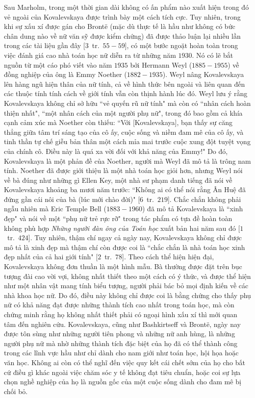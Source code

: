 \begin{multicols}{2}
	Sau Marholm, trong một thời gian dài không có ấn phẩm nào xuất hiện trong đó vẻ ngoài của Kovalevskaya được trình bày một cách tích cực. Tuy nhiên, trong khi sự xấu xí được gán cho Brontë (mặc dù thực tế là hầu như không có bức chân dung nào về nữ văn sỹ được kiểm chứng) đã được thảo luận lại nhiều lần trong các tài liệu gần đây [$3$~tr.~$55-59$],  có một bước ngoặt hoàn toàn trong việc đánh giá cao nhà toán học nữ diễn ra từ những năm $1930$. Nó có lẽ bắt nguồn từ một cáo phó viết vào năm $1935$ bởi Hermann Weyl ($1885-1955$) về đồng nghiệp của ông là Emmy Noether ($1882-1935$). Weyl nâng Kovalevskaya lên hàng ngũ hiện thân của nữ tính, cả về hình thức bên ngoài và liên quan đến các thuộc tính tính cách về giới tính vẫn còn thịnh hành lúc đó. Weyl lưu ý rằng Kovalevskaya không chỉ sở hữu ``vẻ quyến rũ nữ tính" mà còn có ``nhân cách hoàn thiện nhất", ``một nhân cách của một người phụ nữ", trong đó bao gồm cả khía cạnh  cảm xúc mà Noether còn thiếu: ``Với [Kovalevskaya], bạn thấy sự căng thẳng giữa tâm trí sáng tạo của cô ấy, cuộc sống và niềm đam mê của cô ấy, và tinh thần tự chế giễu bản thân một cách mỉa mai trước cuộc xung đột tuyệt vọng của chính cô. Điều này là quá xa vời đối với khả năng của Emmy!" Do đó, Kovalevskaya là một phản đề của Noether, người mà Weyl đã mô tả là trông nam tính. Noether đã được giới thiệu là một nhà toán học giỏi hơn, nhưng Weyl nói về bà đúng như những gì Ellen Key, một nhà sư phạm danh tiếng đã nói về Kovalevskaya khoảng ba mươi năm trước: ``Không ai có thể nói rằng Ân Huệ đã đứng gần cái nôi của bà (lúc mới chào đời)" [$6$~tr.~$219$]. Chắc chắn không phải ngẫu nhiên mà Eric Temple Bell ($1883-1960$) đã mô tả Kovalevskaya là ``xinh đẹp" và nói về một ``phụ nữ trẻ rực rỡ" trong tác phẩm có tựa đề hoàn toàn không phù hợp \textit{Những người đàn ông của Toán học} xuất bản hai năm sau đó [$1$~tr.~$424$]. Tuy nhiên, thậm chí ngay cả ngày nay, Kovalevskaya không chỉ được mô tả là xinh đẹp mà thậm chí còn được coi là ``chắc chắn là nhà toán học xinh đẹp nhất của cả hai giới tính" [$2$~tr.~$78$].
	\vskip 0.1cm
	Theo cách thể hiện hiện đại, Kovalevskaya không đơn thuần là một hình mẫu. Bà thường được đặt trên bục tượng đài cao vời vợi, không nhất thiết theo một cách có ý thức, và được thể hiện như một nhân vật mang tính biểu tượng, người phải bác bỏ mọi định kiến về các nhà khoa học nữ. Do đó, điều này không chỉ được coi là bằng chứng cho thấy phụ nữ có khả năng đạt được những thành tích cao nhất trong toán học, mà còn chứng minh rằng họ không nhất thiết phải có ngoại hình xấu xí thì mới quan tâm đến nghiên cứu. Kovalevskaya, cũng như Bashkirtseff và Brontë, ngày nay được tôn sùng như những người tiên phong và những nữ anh hùng, là những người phụ nữ mà nhờ những thành tích đặc biệt của họ đã có thể thành công trong các lĩnh vực hầu như chỉ dành cho nam giới như toán học, hội họa hoặc văn học. Không ai còn có thể nghĩ đến việc quy kết cái chết sớm của họ cho bất cứ điều gì khác ngoài việc chăm sóc y tế không đạt tiêu chuẩn, hoặc coi sự lựa chọn nghề nghiệp của họ là nguồn gốc của một cuộc sống dành cho đam mê bị chối bỏ.

\end{multicols}
